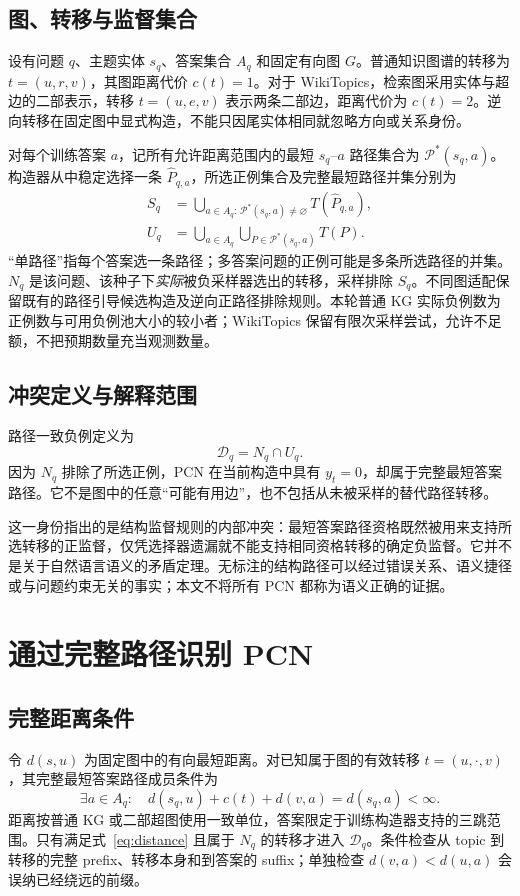 \documentclass[UTF8,a4paper,10pt,fontset=fandol]{ctexart}
\newcommand{\pcn}{\mathcal D_q}
\begin{document}
\subsection{图、转移与监督集合}
设有问题 $q$、主题实体 $s_q$、答案集合 $A_q$ 和固定有向图 $G$。普通知识图谱的转移为 $t=(u,r,v)$，其图距离代价 $c(t)=1$。对于 WikiTopics，检索图采用实体与超边的二部表示，转移 $t=(u,e,v)$ 表示两条二部边，距离代价为 $c(t)=2$。逆向转移在固定图中显式构造，不能只因尾实体相同就忽略方向或关系身份。

对每个训练答案 $a$，记所有允许距离范围内的最短 $s_q$--$a$ 路径集合为 $\mathcal P^*(s_q,a)$。构造器从中稳定选择一条 $\widehat P_{q,a}$，所选正例集合及完整最短路径并集分别为
\begin{align}
S_q &= \bigcup_{a\in A_q:\,\mathcal P^*(s_q,a)\ne\varnothing} T(\widehat P_{q,a}),\\
U_q &= \bigcup_{a\in A_q} \bigcup_{P\in\mathcal P^*(s_q,a)}T(P).
\end{align}
“单路径”指每个答案选一条路径；多答案问题的正例可能是多条所选路径的并集。$N_q$ 是该问题、该种子下\emph{实际}被负采样器选出的转移，采样排除 $S_q$。不同图适配保留既有的路径引导候选构造及逆向正路径排除规则。本轮普通 KG 实际负例数为正例数与可用负例池大小的较小者；WikiTopics 保留有限次采样尝试，允许不足额，不把预期数量充当观测数量。

\subsection{冲突定义与解释范围}
路径一致负例定义为
\begin{equation}
\pcn=N_q\cap U_q.
\label{eq:pcn}
\end{equation}
因为 $N_q$ 排除了所选正例，PCN 在当前构造中具有 $y_t=0$，却属于完整最短答案路径。它不是图中的任意“可能有用边”，也不包括从未被采样的替代路径转移。

这一身份指出的是结构监督规则的内部冲突：最短答案路径资格既然被用来支持所选转移的正监督，仅凭选择器遗漏就不能支持相同资格转移的确定负监督。它并不是关于自然语言语义的矛盾定理。无标注的结构路径可以经过错误关系、语义捷径或与问题约束无关的事实；本文不将所有 PCN 都称为语义正确的证据。

\section{通过完整路径识别 PCN}
\subsection{完整距离条件}
令 $d(s,u)$ 为固定图中的有向最短距离。对已知属于图的有效转移 $t=(u,\cdot,v)$，其完整最短答案路径成员条件为
\begin{equation}
\exists a\in A_q:\quad d(s_q,u)+c(t)+d(v,a)=d(s_q,a)<\infty.
\label{eq:distance}
\end{equation}
距离按普通 KG 或二部超图使用一致单位，答案限定于训练构造器支持的三跳范围。只有满足式~\eqref{eq:distance} 且属于 $N_q$ 的转移才进入 $\pcn$。条件检查从 topic 到转移的完整 prefix、转移本身和到答案的 suffix；单独检查 $d(v,a)<d(u,a)$ 会误纳已经绕远的前缀。
\end{document}
